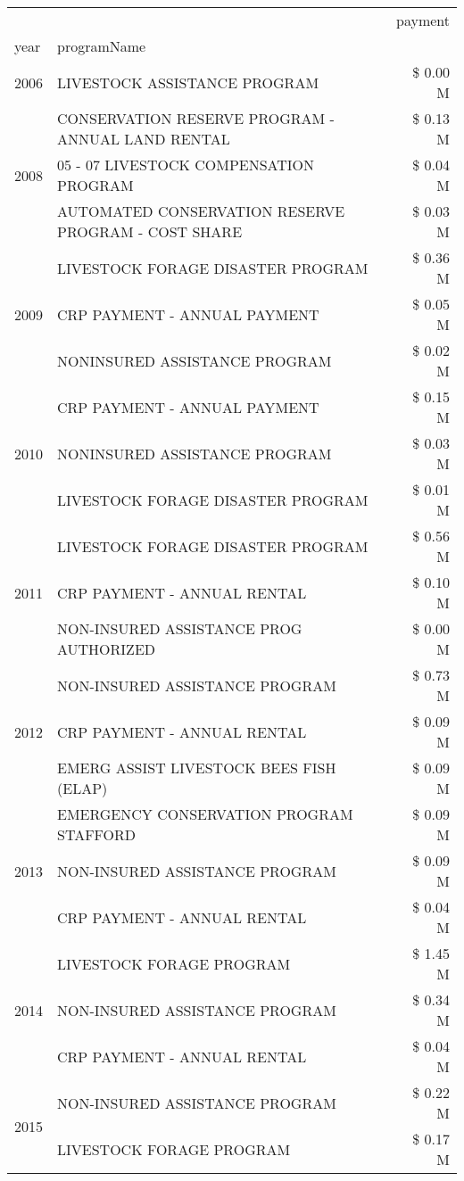 \begin{tabular}{llr}
\toprule
 &  & payment \\
year & programName &  \\
\midrule
2006 & LIVESTOCK ASSISTANCE PROGRAM & \$ 0.00 M \\
\cline{1-3}
\multirow[t]{3}{*}{2008} & CONSERVATION RESERVE PROGRAM - ANNUAL LAND RENTAL & \$ 0.13 M \\
 & 05 - 07 LIVESTOCK COMPENSATION PROGRAM & \$ 0.04 M \\
 & AUTOMATED CONSERVATION RESERVE PROGRAM - COST SHARE & \$ 0.03 M \\
\cline{1-3}
\multirow[t]{3}{*}{2009} & LIVESTOCK FORAGE DISASTER  PROGRAM & \$ 0.36 M \\
 & CRP PAYMENT - ANNUAL PAYMENT & \$ 0.05 M \\
 & NONINSURED ASSISTANCE PROGRAM & \$ 0.02 M \\
\cline{1-3}
\multirow[t]{3}{*}{2010} & CRP PAYMENT - ANNUAL PAYMENT & \$ 0.15 M \\
 & NONINSURED ASSISTANCE PROGRAM & \$ 0.03 M \\
 & LIVESTOCK FORAGE DISASTER  PROGRAM & \$ 0.01 M \\
\cline{1-3}
\multirow[t]{3}{*}{2011} & LIVESTOCK FORAGE DISASTER PROGRAM & \$ 0.56 M \\
 & CRP PAYMENT - ANNUAL RENTAL & \$ 0.10 M \\
 & NON-INSURED ASSISTANCE PROG AUTHORIZED & \$ 0.00 M \\
\cline{1-3}
\multirow[t]{3}{*}{2012} & NON-INSURED ASSISTANCE PROGRAM & \$ 0.73 M \\
 & CRP PAYMENT - ANNUAL RENTAL & \$ 0.09 M \\
 & EMERG ASSIST LIVESTOCK BEES FISH (ELAP) & \$ 0.09 M \\
\cline{1-3}
\multirow[t]{3}{*}{2013} & EMERGENCY CONSERVATION PROGRAM STAFFORD & \$ 0.09 M \\
 & NON-INSURED ASSISTANCE PROGRAM & \$ 0.09 M \\
 & CRP PAYMENT - ANNUAL RENTAL & \$ 0.04 M \\
\cline{1-3}
\multirow[t]{3}{*}{2014} & LIVESTOCK FORAGE PROGRAM & \$ 1.45 M \\
 & NON-INSURED ASSISTANCE PROGRAM & \$ 0.34 M \\
 & CRP PAYMENT - ANNUAL RENTAL & \$ 0.04 M \\
\cline{1-3}
\multirow[t]{3}{*}{2015} & NON-INSURED ASSISTANCE PROGRAM & \$ 0.22 M \\
 & LIVESTOCK FORAGE PROGRAM & \$ 0.17 M \\

\end{tabular}
